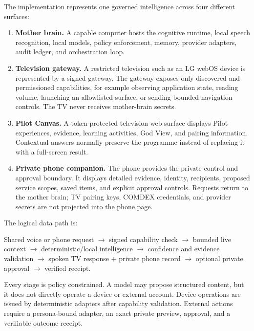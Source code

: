 The implementation represents one governed intelligence across four different
surfaces:

\begin{enumerate}
    \item \textbf{Mother brain.}  A capable computer hosts the cognitive runtime,
    local speech recognition, local models, policy enforcement, memory, provider
    adapters, audit ledger, and orchestration loop.

    \item \textbf{Television gateway.}  A restricted television such as an LG
    webOS device is represented by a signed gateway.  The gateway exposes only
    discovered and permissioned capabilities, for example observing application
    state, reading volume, launching an allowlisted surface, or sending bounded
    navigation controls.  The TV never receives mother-brain secrets.

    \item \textbf{Pilot Canvas.}  A token-protected television web surface
    displays Pilot experiences, evidence, learning activities, God View, and
    pairing information.  Contextual answers normally preserve the programme
    instead of replacing it with a full-screen result.

    \item \textbf{Private phone companion.}  The phone provides the private
    control and approval boundary.  It displays detailed evidence, identity,
    recipients, proposed service scopes, saved items, and explicit approval
    controls.  Requests return to the mother brain; TV pairing keys, COMDEX
    credentials, and provider secrets are not projected into the phone page.
\end{enumerate}

The logical data path is:

\begin{center}
\small
Shared voice or phone request $\rightarrow$ signed capability check
$\rightarrow$ bounded live context $\rightarrow$ deterministic/local
intelligence $\rightarrow$ confidence and evidence validation
$\rightarrow$ spoken TV response $+$ private phone record
$\rightarrow$ optional private approval $\rightarrow$ verified receipt.
\end{center}

Every stage is policy constrained.  A model may propose structured content, but
it does not directly operate a device or external account.  Device operations
are issued by deterministic adapters after capability validation.  External
actions require a persona-bound adapter, an exact private preview, approval, and
a verifiable outcome receipt.


